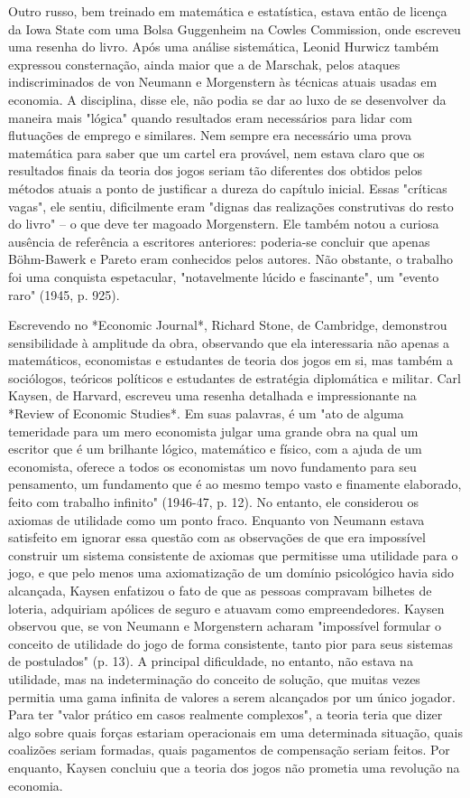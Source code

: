 \documentclass[a4paper,12pt]{article}[abntex2]
\begin{document}
Outro russo, bem treinado em matemática e estatística, estava então de licença da Iowa State com uma Bolsa Guggenheim na Cowles Commission, onde escreveu uma resenha do livro. Após uma análise sistemática, Leonid Hurwicz também expressou consternação, ainda maior que a de Marschak, pelos ataques indiscriminados de von Neumann e Morgenstern às técnicas atuais usadas em economia. A disciplina, disse ele, não podia se dar ao luxo de se desenvolver da maneira mais "lógica" quando resultados eram necessários para lidar com flutuações de emprego e similares. Nem sempre era necessário uma prova matemática para saber que um cartel era provável, nem estava claro que os resultados finais da teoria dos jogos seriam tão diferentes dos obtidos pelos métodos atuais a ponto de justificar a dureza do capítulo inicial. Essas "críticas vagas", ele sentiu, dificilmente eram "dignas das realizações construtivas do resto do livro" – o que deve ter magoado Morgenstern. Ele também notou a curiosa ausência de referência a escritores anteriores: poderia-se concluir que apenas Böhm-Bawerk e Pareto eram conhecidos pelos autores. Não obstante, o trabalho foi uma conquista espetacular, "notavelmente lúcido e fascinante", um "evento raro" (1945, p. 925).

Escrevendo no *Economic Journal*, Richard Stone, de Cambridge, demonstrou sensibilidade à amplitude da obra, observando que ela interessaria não apenas a matemáticos, economistas e estudantes de teoria dos jogos em si, mas também a sociólogos, teóricos políticos e estudantes de estratégia diplomática e militar. Carl Kaysen, de Harvard, escreveu uma resenha detalhada e impressionante na *Review of Economic Studies*. Em suas palavras, é um "ato de alguma temeridade para um mero economista julgar uma grande obra na qual um escritor que é um brilhante lógico, matemático e físico, com a ajuda de um economista, oferece a todos os economistas um novo fundamento para seu pensamento, um fundamento que é ao mesmo tempo vasto e finamente elaborado, feito com trabalho infinito" (1946-47, p. 12). No entanto, ele considerou os axiomas de utilidade como um ponto fraco. Enquanto von Neumann estava satisfeito em ignorar essa questão com as observações de que era impossível construir um sistema consistente de axiomas que permitisse uma utilidade para o jogo, e que pelo menos uma axiomatização de um domínio psicológico havia sido alcançada, Kaysen enfatizou o fato de que as pessoas compravam bilhetes de loteria, adquiriam apólices de seguro e atuavam como empreendedores. Kaysen observou que, se von Neumann e Morgenstern acharam "impossível formular o conceito de utilidade do jogo de forma consistente, tanto pior para seus sistemas de postulados" (p. 13). A principal dificuldade, no entanto, não estava na utilidade, mas na indeterminação do conceito de solução, que muitas vezes permitia uma gama infinita de valores a serem alcançados por um único jogador. Para ter "valor prático em casos realmente complexos", a teoria teria que dizer algo sobre quais forças estariam operacionais em uma determinada situação, quais coalizões seriam formadas, quais pagamentos de compensação seriam feitos. Por enquanto, Kaysen concluiu que a teoria dos jogos não prometia uma revolução na economia.
\end{document}

